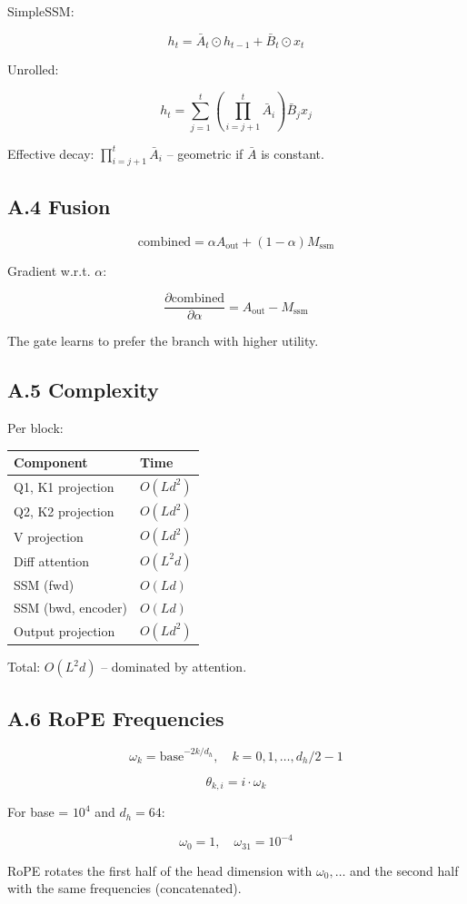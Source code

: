 SimpleSSM:

\[
h_t = \bar{A}_t \odot h_{t-1} + \bar{B}_t \odot x_t
\tag{A.7}
\]

Unrolled:

\[
h_t = \sum_{j=1}^{t} \left( \prod_{i=j+1}^{t} \bar{A}_i \right) \bar{B}_j x_j
\tag{A.8}
\]

Effective decay: $\prod_{i=j+1}^t \bar{A}_i$ -- geometric if $\bar{A}$ is 
constant.

\subsection{A.4 Fusion}

\[
\text{combined} = \alpha A_\text{out} + (1 - \alpha) M_\text{ssm}
\tag{A.9}
\]

Gradient w.r.t. $\alpha$:

\[
\frac{\partial \text{combined}}{\partial \alpha} = A_\text{out} - M_\text{ssm}
\tag{A.10}
\]

The gate learns to prefer the branch with higher utility.

\subsection{A.5 Complexity}

Per block:

\begin{table}[H]
\centering
\small
\begin{tabular}{ll}
\toprule
\textbf{Component} & \textbf{Time} \\
\midrule
Q1, K1 projection & $O(L d^2)$ \\
Q2, K2 projection & $O(L d^2)$ \\
V projection & $O(L d^2)$ \\
Diff attention & $O(L^2 d)$ \\
SSM (fwd) & $O(L d)$ \\
SSM (bwd, encoder) & $O(L d)$ \\
Output projection & $O(L d^2)$ \\
\bottomrule
\end{tabular}
\end{table}

Total: $O(L^2 d)$ -- dominated by attention.

\subsection{A.6 RoPE Frequencies}

\[
\omega_k = \text{base}^{-2k/d_h}, \quad k = 0, 1, \dots, d_h/2 - 1
\tag{A.11}
\]

\[
\theta_{k, i} = i \cdot \omega_k
\tag{A.12}
\]

For base = $10^4$ and $d_h = 64$:

\[
\omega_0 = 1, \quad \omega_{31} = 10^{-4}
\tag{A.13}
\]

RoPE rotates the first half of the head dimension with $\omega_0, \dots$ and 
the second half with the same frequencies (concatenated).

